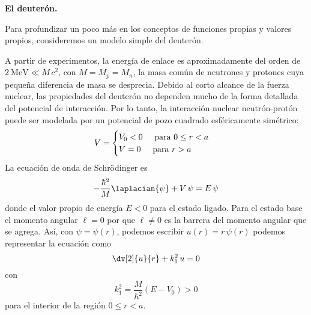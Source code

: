\begin{ejemplo}{\textbf{El deuterón.}}

Para profundizar un poco más en los conceptos de funciones propias y valores propios, consideremos un modelo simple del deuterón.
\par
A partir de experimentos, la energía de enlace es aproximadamente del orden de $\SI{2}{\mega \electronvolt} \ll M \, c^{2} $, con $M = M_{p} = M_{n}$, la masa común de neutrones y protones cuya pequeña diferencia de masa se desprecia. Debido al corto alcance de la fuerza nuclear, las propiedades del deuterón no dependen mucho de la forma detallada del potencial de interacción. Por lo tanto, la interacción nuclear neutrón-protón puede ser modelada por un potencial de pozo cuadrado esféricamente simétrico: 
\begin{equation}
V = \begin{cases}
V_{0} < 0 \hspace{0.5cm} \text{para } 0 \leq r < a \\
V = 0 \hspace{0.5cm} \text{para } r > a
\end{cases}
\end{equation}
La ecuación de onda de Schrödinger es
\begin{equation}
- \dfrac{\hbar^{2}}{M} \laplacian{\psi} + V \, \psi =  E \, \psi
\label{eq:ecuacion_10_10}
\end{equation}
donde el valor propio de energía $E < 0$ para el estado ligado. Para el estado base el momento angular $ \ell = 0$ por que $\ell \neq 0$ es la barrera del momento angular que se agrega. Así, con $\psi =  \psi(r)$, podemos escribir $u(r) = r \, \psi (r)$ podemos representar la ecuación como
\begin{equation}
\dv[2]{u}{r} + k_{1}^{2} \, u = 0
\label{eq:ecuacion_10_11}
\end{equation}
con
\begin{equation}
k_{1}^{2} =  \dfrac{M}{\hbar^{2}} (E - V_{0}) > 0
\label{eq:ecuacion_10_12}
\end{equation}
para el interior de la región $0 \leq r < a$. %

\end{ejemplo}
